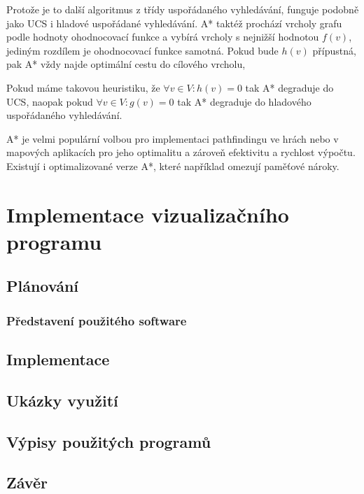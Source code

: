 \documentclass[12pt]{report}			%
\begin{document}
			Protože je to další algoritmus z třídy uspořádaného vyhledávání, funguje podobně jako UCS i hladové uspořádané vyhledávání.
			 A* taktéž prochází vrcholy grafu podle hodnoty ohodnocovací funkce a vybírá vrcholy s nejnižší hodnotou $f(v)$, jediným rozdílem je ohodnocovací funkce samotná.
			Pokud bude $h(v)$ přípustná, pak A* vždy najde optimální cestu do cílového vrcholu, 
			
			
			Pokud máme takovou heuristiku, že $\forall v \in V:h(v) = 0$ tak A* degraduje do UCS, naopak pokud $\forall v \in V:g(v) = 0 $ tak A* degraduje do hladového uspořádaného vyhledávání.
			
			A* je velmi populární volbou pro implementaci pathfindingu ve hrách nebo v mapových aplikacích pro jeho optimalitu a zároveň efektivitu a rychlost výpočtu. Existují i optimalizované verze A*, které například omezují paměťové nároky.
			
			
			
	
	\part{Implementace vizualizačního programu}
	
		
		
		\chapter{Plánování}
			\section{Představení použitého software}
		
		\chapter{Implementace}
		
		\chapter{Ukázky využití}
		
		\chapter{Výpisy použitých programů}




	\chapter*{Závěr}
	
\end{document}
